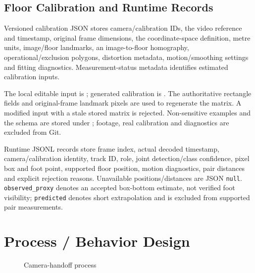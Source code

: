 \subsection{Floor Calibration and Runtime Records}
Versioned calibration JSON stores camera/calibration IDs, the video reference and timestamp, original frame dimensions, the coordinate-space definition, metre units, image/floor landmarks, an image-to-floor homography, operational/exclusion polygons, distortion metadata, motion/smoothing settings and fitting diagnostics. Measurement-status metadata identifies estimated calibration inputs.

The local editable input is ; generated calibration is . The authoritative rectangle fields and original-frame landmark pixels are used to regenerate the matrix. A modified input with a stale stored matrix is rejected. Non-sensitive examples and the schema are stored under ; footage, real calibration and diagnostics are excluded from Git.

Runtime JSONL records store frame index, actual decoded timestamp, camera/calibration identity, track ID, role, joint detection/class confidence, pixel box and foot point, supported floor position, motion diagnostics, pair distances and explicit rejection reasons. Unavailable positions/distances are JSON \texttt{null}. \texttt{observed\_proxy} denotes an accepted box-bottom estimate, not verified foot visibility; \texttt{predicted} denotes short extrapolation and is excluded from supported pair measurements.

\section{Process / Behavior Design}
\begin{figure}[H]
\centering
{}
\caption{Camera-handoff process}
\label{fig:handoff}
\end{figure}

